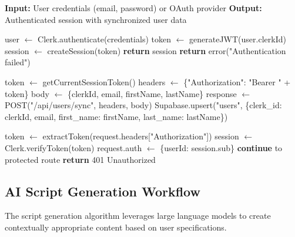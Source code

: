 \begin{algorithm}[H]
\caption{User Authentication and Synchronization}
\begin{algorithmic}[1]
\State \textbf{Input:} User credentials (email, password) or OAuth provider
\State \textbf{Output:} Authenticated session with synchronized user data

    \State user $\gets$ Clerk.authenticate(credentials)
        \State token $\gets$ generateJWT(user.clerkId)
        \State session $\gets$ createSession(token)
        \State {}
        \State \textbf{return} session
    \Else
        \State \textbf{return} error("Authentication failed")
    \EndIf
\EndProcedure

    \State token $\gets$ getCurrentSessionToken()
    \State headers $\gets$ \{"Authorization": "Bearer " + token\}
    \State body $\gets$ \{clerkId, email, firstName, lastName\}
    \State response $\gets$ POST("/api/users/sync", headers, body)
        \State Supabase.upsert("users", \{clerk\_id: clerkId, email, first\_name: firstName, last\_name: lastName\})
    \EndIf
\EndProcedure

    \State token $\gets$ extractToken(request.headers["Authorization"])
    \State session $\gets$ Clerk.verifyToken(token)
        \State request.auth $\gets$ \{userId: session.sub\}
        \State \textbf{continue} to protected route
    \Else
        \State \textbf{return} 401 Unauthorized
    \EndIf
\EndProcedure
\end{algorithmic}
\end{algorithm}

\subsection{AI Script Generation Workflow}

The script generation algorithm leverages large language models to create contextually appropriate content based on user specifications.

